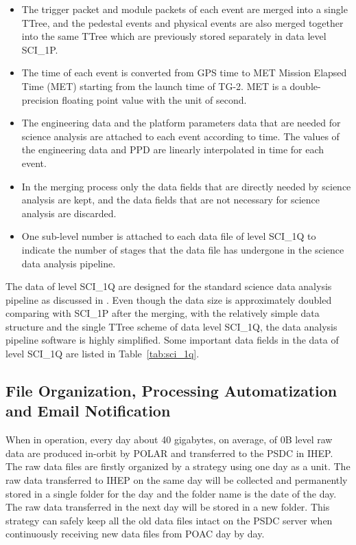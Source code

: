 \documentclass{raa}
\begin{document}
\begin{itemize}
\item The trigger packet and module packets of each event are merged into a single TTree, and the pedestal events and physical events are also merged together into the same TTree which are previously stored separately in data level SCI\_1P.
\item The time of each event is converted from GPS time to MET Mission Elapsed Time (MET) starting from the launch time of TG-2. MET is a double-precision floating point value with the unit of second.
\item The engineering data and the platform parameters data that are needed for science analysis are attached to each event according to time. The values of the engineering data and PPD are linearly interpolated in time for each event.
\item In the merging process only the data fields that are directly needed by science analysis are kept, and the data fields that are not necessary for science analysis are discarded.
\item One sub-level number is attached to each data file of level SCI\_1Q to indicate the number of stages that the data file has undergone in the science data analysis pipeline.
\end{itemize}

The data of level SCI\_1Q are designed for the standard science data analysis pipeline as discussed in \citealt{LI20188}. Even though the data size is approximately doubled comparing with SCI\_1P after the merging, with the relatively simple data structure and the single TTree scheme of data level SCI\_1Q, the data analysis pipeline software is highly simplified. Some important data fields in the data of level SCI\_1Q are listed in Table~\ref{tab:sci_1q}.

\subsection{File Organization, Processing Automatization and Email Notification}
When in operation, every day about 40 gigabytes, on average, of 0B level raw data are produced in-orbit by POLAR and transferred to the PSDC in IHEP. The raw data files are firstly organized by a strategy using one day as a unit. The raw data transferred to IHEP on the same day will be collected and permanently stored in a single folder for the day and the folder name is the date of the day. The raw data transferred in the next day will be stored in a new folder. This strategy can safely keep all the old data files intact on the PSDC server when continuously receiving new data files from POAC day by day.
\end{document}
